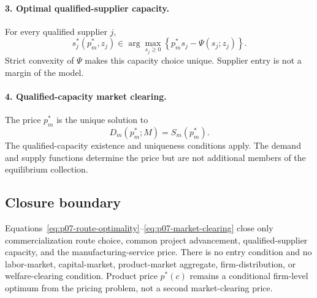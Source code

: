 \paragraph{3. Optimal qualified-supplier capacity.}
For every qualified supplier \(j\),
\begin{equation}
  s_j^*(p_m^*,z_j)
  \in
  \arg\max_{s_j\geq0}
  \left\{
    p_m^*s_j-\Psi(s_j;z_j)
  \right\}.
  \label{eq:p07-capacity-optimality}
\end{equation}
Strict convexity of \(\Psi\) makes this capacity choice unique. Supplier entry
is not a margin of the model.

\paragraph{4. Qualified-capacity market clearing.}
The price \(p_m^*\) is the unique solution to
\begin{equation}
  D_m(p_m^*;M)=S_m(p_m^*).
  \label{eq:p07-market-clearing}
\end{equation}
The qualified-capacity existence and uniqueness conditions apply. The demand and supply
functions determine the price but are not additional members of the
equilibrium collection.

\subsection{Closure boundary}
\label{subsec:p07-closure-boundary}

Equations~\eqref{eq:p07-route-optimality}--\eqref{eq:p07-market-clearing}
close only commercialization route choice, common project advancement,
qualified-supplier capacity, and the manufacturing-service price. There is no
entry condition and no labor-market, capital-market, product-market aggregate,
firm-distribution, or welfare-clearing condition. Product price \(p^*(c)\)
remains a conditional firm-level optimum from the pricing problem, not a second
market-clearing price.
